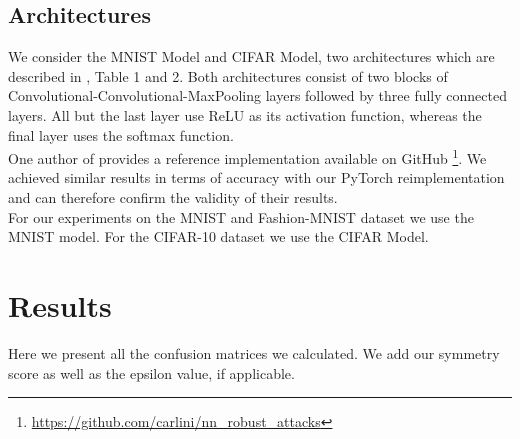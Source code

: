 \documentclass{article}
\begin{document}
\subsection{Architectures}
We consider the MNIST Model and CIFAR Model, two architectures which are described in \cite{carlini2017towards}, Table 1 and 2. Both architectures consist of two blocks of Convolutional-Convolutional-MaxPooling layers followed by three fully connected layers. All but the last layer use ReLU \cite{maas2013rectifier} as its activation function, whereas the final layer uses the softmax function.\\
One author of \cite{carlini2017towards} provides a reference implementation available on GitHub \footnote{\url{https://github.com/carlini/nn_robust_attacks}}. We achieved similar results in terms of accuracy with our PyTorch reimplementation and can therefore confirm the validity of their results.  \\
For our experiments on the MNIST and Fashion-MNIST dataset we use the MNIST model. For the CIFAR-10 dataset we use the CIFAR Model.

\section{Results}
\label{sec:results}
Here we present all the confusion matrices we calculated. We add our symmetry score as well as the epsilon value, if applicable.
\end{document}

